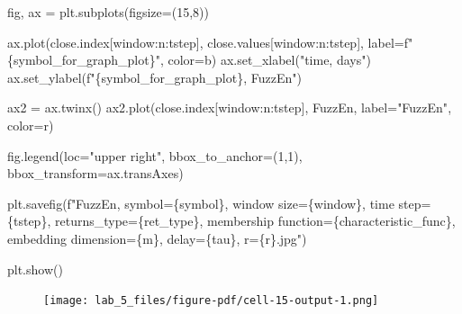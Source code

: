 \documentclass[
  letterpaper,
]{report}
\newenvironment{Shaded}{\begin{snugshade}}{\end{snugshade}}
\newcommand{\DecValTok}[1]{\textcolor[rgb]{0.68,0.00,0.00}{#1}}
\newcommand{\NormalTok}[1]{\textcolor[rgb]{0.00,0.23,0.31}{#1}}
\newcommand{\OperatorTok}[1]{\textcolor[rgb]{0.37,0.37,0.37}{#1}}
\newcommand{\SpecialCharTok}[1]{\textcolor[rgb]{0.37,0.37,0.37}{#1}}
\newcommand{\SpecialStringTok}[1]{\textcolor[rgb]{0.13,0.47,0.30}{#1}}
\newcommand{\StringTok}[1]{\textcolor[rgb]{0.13,0.47,0.30}{#1}}
\begin{document}
\begin{Shaded}
\begin{Highlighting}[]
\NormalTok{fig, ax }\OperatorTok{=}\NormalTok{ plt.subplots(figsize}\OperatorTok{=}\NormalTok{(}\DecValTok{15}\NormalTok{,}\DecValTok{8}\NormalTok{))}

\NormalTok{ax.plot(close.index[window:n:tstep], close.values[window:n:tstep], label}\OperatorTok{=}\SpecialStringTok{f"}\SpecialCharTok{\{}\NormalTok{symbol\_for\_graph\_plot}\SpecialCharTok{\}}\SpecialStringTok{"}\NormalTok{, color}\OperatorTok{=}\StringTok{\textquotesingle{}b\textquotesingle{}}\NormalTok{)}
\NormalTok{ax.set\_xlabel(}\StringTok{"time, days"}\NormalTok{)}
\NormalTok{ax.set\_ylabel(}\SpecialStringTok{f"}\SpecialCharTok{\{}\NormalTok{symbol\_for\_graph\_plot}\SpecialCharTok{\}}\SpecialStringTok{, FuzzEn"}\NormalTok{)}

\NormalTok{ax2 }\OperatorTok{=}\NormalTok{ ax.twinx()}
\NormalTok{ax2.plot(close.index[window:n:tstep], FuzzEn, label}\OperatorTok{=}\StringTok{"FuzzEn"}\NormalTok{, color}\OperatorTok{=}\StringTok{\textquotesingle{}r\textquotesingle{}}\NormalTok{)}

\NormalTok{fig.legend(loc}\OperatorTok{=}\StringTok{"upper right"}\NormalTok{, bbox\_to\_anchor}\OperatorTok{=}\NormalTok{(}\DecValTok{1}\NormalTok{,}\DecValTok{1}\NormalTok{), bbox\_transform}\OperatorTok{=}\NormalTok{ax.transAxes)}

\NormalTok{plt.savefig(}\SpecialStringTok{f"FuzzEn, symbol=}\SpecialCharTok{\{}\NormalTok{symbol}\SpecialCharTok{\}}\SpecialStringTok{, window size=}\SpecialCharTok{\{}\NormalTok{window}\SpecialCharTok{\}}\SpecialStringTok{, time step=}\SpecialCharTok{\{}\NormalTok{tstep}\SpecialCharTok{\}}\SpecialStringTok{, returns\_type=}\SpecialCharTok{\{}\NormalTok{ret\_type}\SpecialCharTok{\}}\SpecialStringTok{, membership function=}\SpecialCharTok{\{}\NormalTok{characteristic\_func}\SpecialCharTok{\}}\SpecialStringTok{, embedding dimension=}\SpecialCharTok{\{}\NormalTok{m}\SpecialCharTok{\}}\SpecialStringTok{, delay=}\SpecialCharTok{\{}\NormalTok{tau}\SpecialCharTok{\}}\SpecialStringTok{, r=}\SpecialCharTok{\{}\NormalTok{r}\SpecialCharTok{\}}\SpecialStringTok{.jpg"}\NormalTok{)}

\NormalTok{plt.show()}
\end{Highlighting}
\end{Shaded}

\begin{figure}[H]

{\centering \texttt{[image: lab\_5\_files/figure-pdf/cell-15-output-1.png]}

}

\end{figure}
\end{document}
